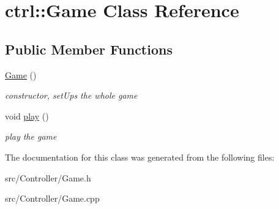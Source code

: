 \hypertarget{classctrl_1_1_game}{}\section{ctrl\+:\+:Game Class Reference}
\label{classctrl_1_1_game}
\subsection*{Public Member Functions}
\begin{DoxyCompactItemize}
\item 
\mbox{\label{classctrl_1_1_game_ae759dbbef5d8a9379a9c91ed9d02ae31}} 
\mbox{\hyperlink{classctrl_1_1_game_ae759dbbef5d8a9379a9c91ed9d02ae31}{Game}} ()
\begin{DoxyCompactList}\small\item\em constructor, set\+Ups the whole game \end{DoxyCompactList}\item 
\mbox{\label{classctrl_1_1_game_a3059b1a1d943d2dba5a1e159a428ee0a}} 
void \mbox{\hyperlink{classctrl_1_1_game_a3059b1a1d943d2dba5a1e159a428ee0a}{play}} ()
\begin{DoxyCompactList}\small\item\em play the game \end{DoxyCompactList}\end{DoxyCompactItemize}


The documentation for this class was generated from the following files\+:\begin{DoxyCompactItemize}
\item 
src/\+Controller/Game.\+h\item 
src/\+Controller/Game.\+cpp\end{DoxyCompactItemize}
